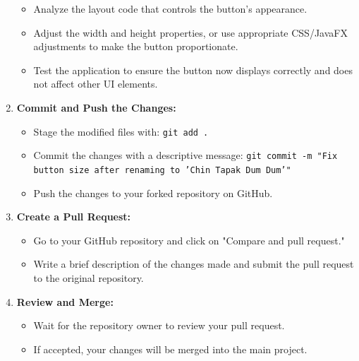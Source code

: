 \documentclass{article}
\begin{document}
\begin{enumerate}[label=\arabic*.]
    \begin{itemize}
        \item Analyze the layout code that controls the button's appearance.
        \item Adjust the width and height properties, or use appropriate CSS/JavaFX adjustments to make the button proportionate.
        \item Test the application to ensure the button now displays correctly and does not affect other UI elements.
    \end{itemize}
    \item \textbf{Commit and Push the Changes:}
    \begin{itemize}
        \item Stage the modified files with: \texttt{git add .}
        \item Commit the changes with a descriptive message: \texttt{git commit -m "Fix button size after renaming to 'Chin Tapak Dum Dum'"}
        \item Push the changes to your forked repository on GitHub.
    \end{itemize}
    \item \textbf{Create a Pull Request:}
    \begin{itemize}
        \item Go to your GitHub repository and click on "Compare and pull request."
        \item Write a brief description of the changes made and submit the pull request to the original repository.
    \end{itemize}
    \item \textbf{Review and Merge:}
    \begin{itemize}
        \item Wait for the repository owner to review your pull request.
        \item If accepted, your changes will be merged into the main project.
    \end{itemize}
\end{enumerate}
\end{document}
